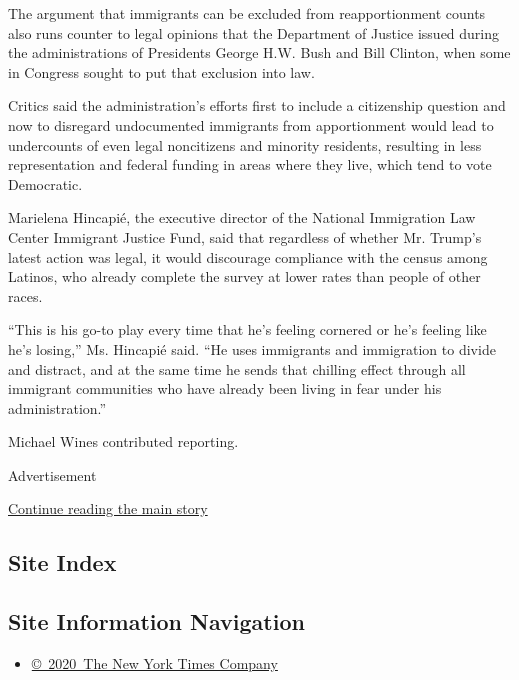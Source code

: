 The argument that immigrants can be excluded from reapportionment counts
also runs counter to legal opinions that the Department of Justice
issued during the administrations of Presidents George H.W. Bush and
Bill Clinton, when some in Congress sought to put that exclusion into
law.

Critics said the administration's efforts first to include a citizenship
question and now to disregard undocumented immigrants from apportionment
would lead to undercounts of even legal noncitizens and minority
residents, resulting in less representation and federal funding in areas
where they live, which tend to vote Democratic.

Marielena Hincapié, the executive director of the National Immigration
Law Center Immigrant Justice Fund, said that regardless of whether Mr.
Trump's latest action was legal, it would discourage compliance with the
census among Latinos, who already complete the survey at lower rates
than people of other races.

``This is his go-to play every time that he's feeling cornered or he's
feeling like he's losing,'' Ms. Hincapié said. ``He uses immigrants and
immigration to divide and distract, and at the same time he sends that
chilling effect through all immigrant communities who have already been
living in fear under his administration.''

Michael Wines contributed reporting.

Advertisement

\protect\hyperlink{after-bottom}{Continue reading the main story}

\hypertarget{site-index}{%
\subsection{Site Index}\label{site-index}}

\hypertarget{site-information-navigation}{%
\subsection{Site Information
Navigation}\label{site-information-navigation}}

\begin{itemize}
\tightlist
\item
  \href{https://help.nytimes.com/hc/en-us/articles/115014792127-Copyright-notice}{©~2020~The
  New York Times Company}
\end{itemize}

